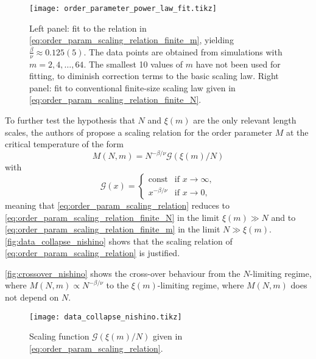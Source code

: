 
\begin{figure}
  \texttt{[image: order\_parameter\_power\_law\_fit.tikz]}
  \caption{Left panel: fit to the relation in
  \autoref{eq:order_param_scaling_relation_finite_m}, yielding $\frac{\beta}{\nu} \approx
  0.125(5)$. The data points are obtained from simulations with $m = 2, 4, \dots, 64$. The
  smallest 10 values of $m$ have not been used for fitting, to diminish correction terms
  to the basic scaling law. Right panel: fit to conventional finite-size scaling law
  given in \autoref{eq:order_param_scaling_relation_finite_N}.
  }
  \label{fig:order_parameter_power_law_fit}
\end{figure}

To further test the hypothesis that $N$ and $\xi(m)$ are the only relevant length scales,
the authors of \cite{nishino1996numerical} propose a scaling relation for the order
parameter $M$ at the critical temperature of the form
\begin{equation}\label{eq:order_param_scaling_relation}
  M(N, m) = N^{-\beta/\nu} \mathcal{G}(\xi(m) / N)
\end{equation}
with
\begin{equation}
  \mathcal{G}(x) =
  \begin{cases}
    \text{const} & \text{if } x \to \infty, \\
    x^{-\beta/\nu} & \text{if } x \to 0,
  \end{cases}
\end{equation}
meaning that \autoref{eq:order_param_scaling_relation} reduces to
\autoref{eq:order_param_scaling_relation_finite_N} in the limit $\xi(m) \gg N$ and to
\autoref{eq:order_param_scaling_relation_finite_m} in the limit $N \gg \xi(m)$.
\autoref{fig:data_collapse_nishino} shows that the scaling relation of \autoref{eq:order_param_scaling_relation}
is justified.

\autoref{fig:crossover_nishino} shows the cross-over behaviour from the $N$-limiting regime, where
$M(N, m) \propto N^{-\beta/\nu}$ to the $\xi(m)$-limiting regime, where $M(N, m)$ does not depend on $N$.

\begin{figure}
  \texttt{[image: data\_collapse\_nishino.tikz]}
  \caption{Scaling function $\mathcal{G}(\xi(m)/N)$ given in
  \autoref{eq:order_param_scaling_relation}.}\label{fig:data_collapse_nishino}
\end{figure}

